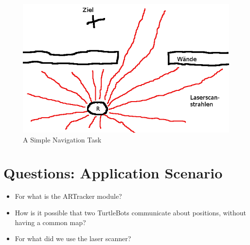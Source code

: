 \begin{figure}[htbp]
 \includegraphics[width=\textwidth]{pic/simple_nav.png}
 \caption{A Simple Navigation Task}
 \label{fig:nav_task}
\end{figure}

\section{Questions: Application Scenario}
\label{sec:questions_app_scenario}

\begin{itemize}
 \item For what is the ARTracker module?
 \item How is it possible that two TurtleBots communicate about positions, without having a common map?
 \item For what did we use the laser scanner?
\end{itemize}


